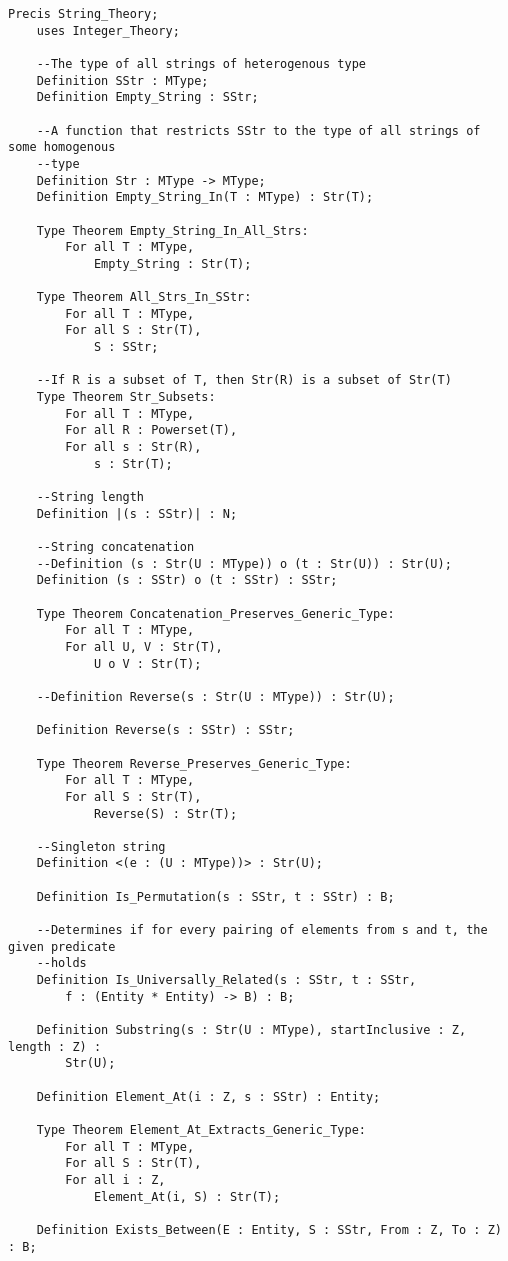 \begin{lstlisting}[language=resolve]
Precis String_Theory;
    uses Integer_Theory;

	--The type of all strings of heterogenous type
	Definition SStr : MType;
	Definition Empty_String : SStr;

	--A function that restricts SStr to the type of all strings of some homogenous
	--type
	Definition Str : MType -> MType;
	Definition Empty_String_In(T : MType) : Str(T);

	Type Theorem Empty_String_In_All_Strs:
		For all T : MType,
			Empty_String : Str(T);

	Type Theorem All_Strs_In_SStr:
		For all T : MType,
		For all S : Str(T),
			S : SStr;

	--If R is a subset of T, then Str(R) is a subset of Str(T)
	Type Theorem Str_Subsets:
		For all T : MType,
		For all R : Powerset(T),
		For all s : Str(R),
			s : Str(T);

	--String length
	Definition |(s : SStr)| : N;

	--String concatenation
	--Definition (s : Str(U : MType)) o (t : Str(U)) : Str(U);
	Definition (s : SStr) o (t : SStr) : SStr;

	Type Theorem Concatenation_Preserves_Generic_Type:
		For all T : MType,
		For all U, V : Str(T),
			U o V : Str(T);

	--Definition Reverse(s : Str(U : MType)) : Str(U);

	Definition Reverse(s : SStr) : SStr;

	Type Theorem Reverse_Preserves_Generic_Type:
		For all T : MType,
		For all S : Str(T),
			Reverse(S) : Str(T);

	--Singleton string
	Definition <(e : (U : MType))> : Str(U);

	Definition Is_Permutation(s : SStr, t : SStr) : B;

	--Determines if for every pairing of elements from s and t, the given predicate
	--holds
	Definition Is_Universally_Related(s : SStr, t : SStr, 
		f : (Entity * Entity) -> B) : B;

	Definition Substring(s : Str(U : MType), startInclusive : Z, length : Z) :
		Str(U);

	Definition Element_At(i : Z, s : SStr) : Entity;

	Type Theorem Element_At_Extracts_Generic_Type:
		For all T : MType,
		For all S : Str(T),
		For all i : Z,
			Element_At(i, S) : Str(T);

	Definition Exists_Between(E : Entity, S : SStr, From : Z, To : Z) : B;


\end{lstlisting}
